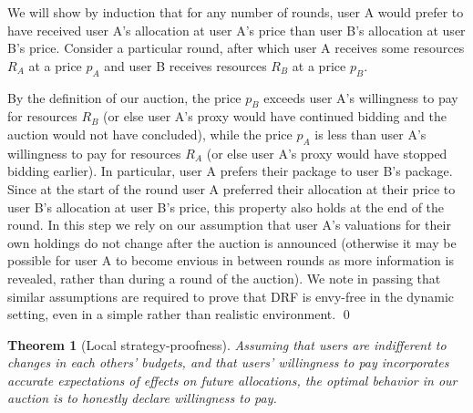 \documentclass{acm_proc_article-sp}
\newtheorem{theorem}{Theorem}[section]
\newenvironment{pproof}[1][Proof]{\begin{trivlist}
\item[\hskip \labelsep {\bfseries #1}]}{\end{trivlist}}
\begin{document}
\begin{pproof}
We will show by induction that for any number of rounds, user A would prefer to have received user A's allocation at user A's price than user B's allocation at user B's price. Consider a particular round, after which user A receives some resources $R_A$ at a price $p_A$ and user B receives resources $R_B$ at a price $p_B$.

By the definition of our auction, the price $p_B$ exceeds user A's willingness to pay for resources $R_B$ 
(or else user A's proxy would have continued bidding and the auction would not have concluded), 
while the price $p_A$ is less than user A's willingness to pay for resources $R_A$ 
(or else user A's proxy would have stopped bidding earlier). 
In particular, user A prefers their package to user B's package. 
Since at the start of the round user A preferred their allocation at their price to user B's allocation at user B's price, 
this property also holds at the end of the round. 
In this step we rely on our assumption that user A's valuations for their own holdings do not change after the auction is announced 
(otherwise it may be possible for user A to become envious in between rounds as more information is revealed, rather than during a round of the auction). 
We note in passing that similar assumptions are required to prove that DRF is envy-free in the dynamic setting,
even in a simple rather than realistic environment.
\qed
\end{pproof}


\begin{theorem}[Local strategy-proofness] 
Assuming that users are indifferent to changes in each others' budgets,
and that users' willingness to pay 
incorporates accurate expectations of effects on future allocations, 
the optimal behavior in our auction is to honestly declare willingness to pay.
\end{theorem}
\end{document}
